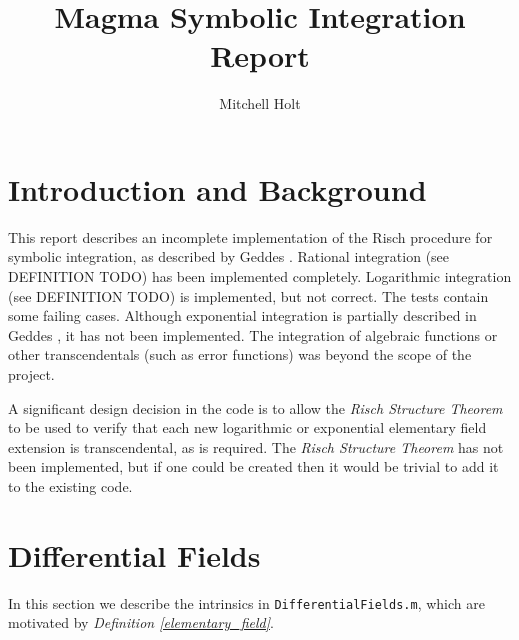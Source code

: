 \documentclass{article}
\title{Magma Symbolic Integration Report}
\author{Mitchell Holt}
\theoremstyle{plain}
\theoremstyle{definition}
\newcommand{\defref}[1]{\emph{Definition \ref{#1}}}
\begin{document}
\maketitle

\tableofcontents

\newpage

\section{Introduction and Background}

This report describes an incomplete implementation of the Risch procedure for
symbolic integration, as described by Geddes \cite{geddes:afca}. Rational
integration (see DEFINITION TODO) has been implemented completely. Logarithmic
integration (see DEFINITION TODO) is implemented, but not correct. The tests
contain some failing cases. Although exponential integration is partially
described in Geddes \cite{geddes:afca}, it has not been implemented. The
integration of algebraic functions or other transcendentals (such as error
functions) was beyond the scope of the project. \medbreak

A significant design decision in the code is to allow the \emph{Risch Structure
Theorem} \cite{risch:algprops} to be used to verify that each new logarithmic or
exponential elementary field extension is transcendental, as is required. The
\emph{Risch Structure Theorem} has not been implemented, but if one could be
created then it would be trivial to add it to the existing code.

\section{Differential Fields}

In this section we describe the intrinsics in \lstinline{DifferentialFields.m},
which are motivated by \defref{elementary_field}.
\end{document}
